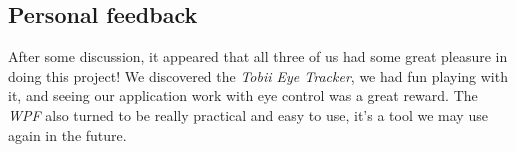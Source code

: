 \documentclass[12pt, a4paper]{article}
\begin{document}
\subsection{Personal feedback}
After some discussion, it appeared that all three of us had some great pleasure in doing this project! We discovered the \textit{Tobii Eye Tracker}, we had fun playing with it, and seeing our application work with eye control was a great reward. The \textit{WPF} also turned to be really practical and easy to use, it's a tool we may use again in the future. \\

 
\end{document}
